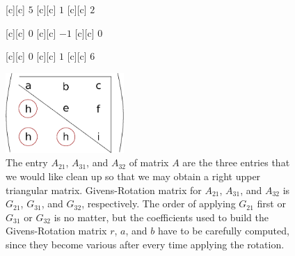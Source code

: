 \begin{figure}[htb!]
	\centering
	\footnotesize

	[c] {$5$}
	[c] {$1$}
	[c] {$2$}

	[c] {$0$}
	[c] {$-1$}
	[c] {$0$}

	[c] {$0$}
	[c] {$1$}
	[c] {$6$}

	\includegraphics[width=0.4\textwidth]{matrixA213132.eps}
	\caption{The entry $A_{21}$, $A_{31}$, and $A_{32}$ of matrix $A$ are the three entries
		that we would like clean up
		so that we may obtain a right upper triangular matrix.
		Givens-Rotation matrix for $A_{21}$, $A_{31}$, and $A_{32}$ is $G_{21}$, $G_{31}$, and $G_{32}$, respectively.
		The order of applying $G_{21}$ first or $G_{31}$ or $G_{32}$ is no matter, but
		the coefficients used to build the Givens-Rotation matrix $r$, $a$, and $b$
		have to be carefully computed, since they become various
		after every time applying the rotation.}
	\label{\LABEL}
\end{figure}
